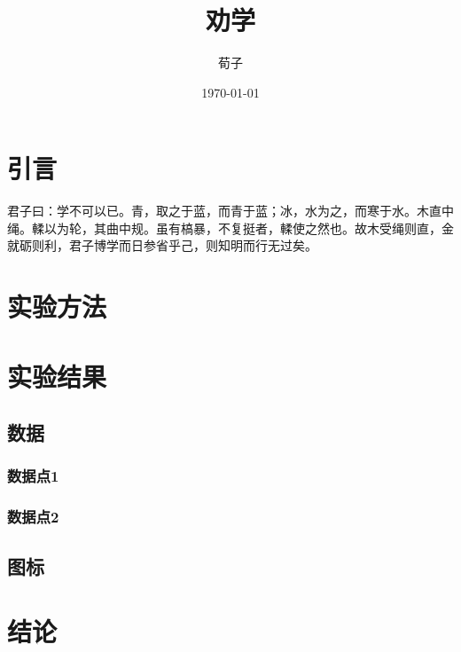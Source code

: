 \documentclass[10pt]{report} %
\title{\heiti 劝学}
\author{\kaishu 荀子}
\date{\today}
\begin{document}
	\maketitle
	\tableofcontents	%
	
	\section{引言}
	君子曰：学不可以已。青，取之于蓝，而青于蓝；冰，水为之，而寒于水。木直中绳。輮以为轮，其曲中规。虽有槁暴，不复挺者，輮使之然也。故木受绳则直，金就砺则利，君子博学而日参省乎己，则知明而行无过矣。
	
	
	\section{实验方法}
	\section{实验结果}
	\subsection{数据}
	\subsubsection{数据点1}
	\subsubsection{数据点2}
	\subsection{图标}
	\section{结论}
\end{document}
